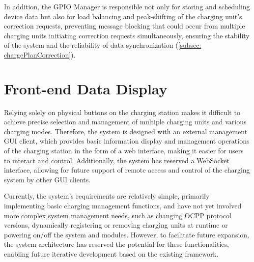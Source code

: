 \documentclass[
	english,
	ruledheaders=section,%
	class=report,%
	thesis={type=Report},%
	accentcolor=9c,%
	custommargins=true,%
	marginpar=false,%
	parskip=half-,%
	fontsize=11pt,%
	logofile={img/tuda_logo.pdf}, %
]{tudapub}
\begin{document}
In addition, the GPIO Manager is responsible not only for storing and scheduling device data but also for load balancing and peak-shifting of the charging unit's correction requests, preventing message blocking that could occur from multiple charging units initiating correction requests simultaneously, ensuring the stability of the system and the reliability of data synchronization (\autoref{subsec: chargePlanCorrection}).


\chapter{Front-end Data Display}
\label{chap:Front-end Display}


Relying solely on physical buttons on the charging station makes it difficult to achieve precise selection and management of multiple charging units and various charging modes. Therefore, the system is designed with an external management \ac{GUI} client, which provides basic information display and management operations of the charging station in the form of a web interface, making it easier for users to interact and control. Additionally, the system has reserved a WebSocket interface, allowing for future support of remote access and control of the charging system by other \ac{GUI} clients.

Currently, the system's requirements are relatively simple, primarily implementing basic charging management functions, and have not yet involved more complex system management needs, such as changing \ac{OCPP} protocol versions, dynamically registering or removing charging units at runtime or powering on/off the system and modules. However, to facilitate future expansion, the system architecture has reserved the potential for these functionalities, enabling future iterative development based on the existing framework.
\end{document}
